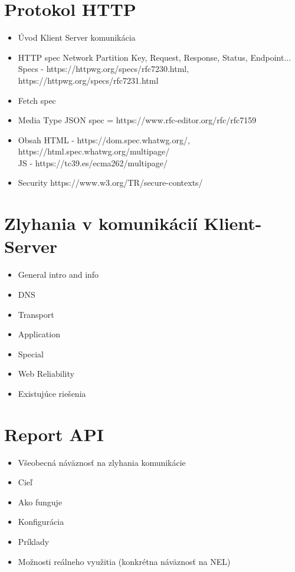 \section{Protokol HTTP}
\begin{itemize}
    \item Úvod 
    Klient Server komunikácia
    \item HTTP spec
    Network Partition Key, Request, Response, Status, Endpoint...
    \\
    Specs - https://httpwg.org/specs/rfc7230.html, https://httpwg.org/specs/rfc7231.html
    \item Fetch spec
    \item Media Type
    JSON spec = https://www.rfc-editor.org/rfc/rfc7159
    \item Obsah
    HTML - https://dom.spec.whatwg.org/, https://html.spec.whatwg.org/multipage/ 
    \\
    JS - https://tc39.es/ecma262/multipage/
    \item Security
    https://www.w3.org/TR/secure-contexts/
\end{itemize}

\section{Zlyhania v komunikácií Klient-Server}
\begin{itemize}
    \item General intro and info
    \item DNS
    \item Transport
    \item Application
    \item Special
    \item Web Reliability
    \item Existujúce riešenia
\end{itemize}

\section{Report API}
\begin{itemize}
    \item Všeobecná náväznosť na zlyhania komunikácie
    \item Cieľ
    \item Ako funguje
    \item Konfigurácia
    \item Príklady
    \item Možnosti reálneho využitia (konkrétna náväznosť na NEL)
\end{itemize}

